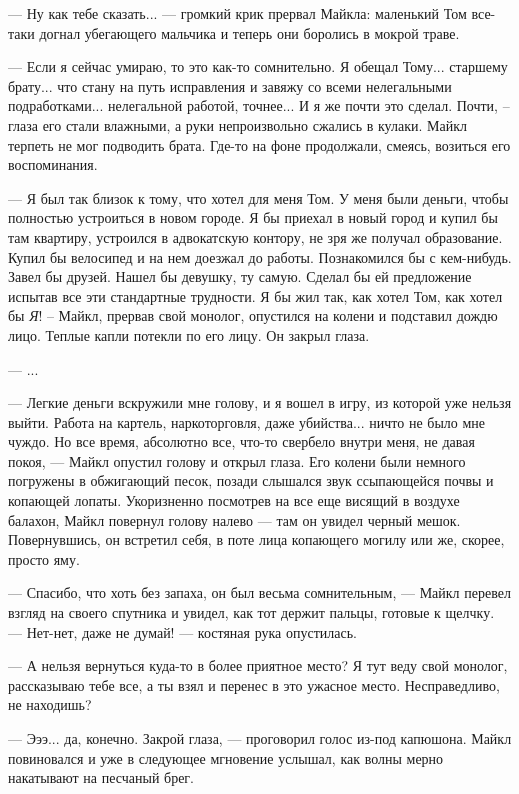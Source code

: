 — Ну как тебе сказать... — громкий крик прервал Майкла: маленький Том все-таки догнал убегающего мальчика и теперь они боролись в мокрой траве. 

— Если я сейчас умираю, то это как-то сомнительно. Я обещал Тому... старшему брату... что стану на путь исправления и завяжу со всеми нелегальными подработками... нелегальной работой, точнее...  И я же почти это сделал. Почти, – глаза его стали влажными, а руки непроизвольно сжались в кулаки. Майкл терпеть не мог подводить брата. Где-то на фоне продолжали, смеясь, возиться его воспоминания.

— Я был так близок к тому, что хотел для меня Том. У меня были деньги, чтобы полностью устроиться в новом городе. Я бы приехал в новый город и купил бы там квартиру, устроился в адвокатскую контору, не зря же получал образование. Купил бы велосипед и на нем доезжал до работы. Познакомился бы с кем-нибудь. Завел бы друзей. Нашел бы девушку, ту самую. Сделал бы ей предложение испытав все эти стандартные трудности. Я бы жил так, как хотел Том, как хотел бы \textit{Я}! – Майкл, прервав свой монолог, опустился на колени и подставил дождю лицо. Теплые капли потекли по его лицу. Он закрыл глаза.

— ... 

— Легкие деньги вскружили мне голову, и я вошел в игру, из которой уже нельзя выйти. Работа на картель, наркоторговля, даже убийства... ничто не было мне чуждо. Но все время, абсолютно все, что-то свербело внутри меня, не давая покоя, — Майкл опустил голову и открыл глаза. Его колени были немного погружены в обжигающий песок, позади слышался звук ссыпающейся почвы и копающей лопаты. Укоризненно посмотрев на все еще висящий в воздухе балахон, Майкл повернул голову налево — там он увидел черный мешок. Повернувшись, он встретил себя, в поте лица копающего могилу или же, скорее, просто яму. 

— Спасибо, что хоть без запаха, он был весьма сомнительным, — Майкл перевел взгляд на своего спутника и увидел, как тот держит пальцы, готовые к щелчку. — Нет-нет, даже не думай! — костяная рука опустилась.

— А нельзя вернуться куда-то в более приятное место? Я тут веду свой монолог, рассказываю тебе все, а ты взял и перенес в это ужасное место. Несправедливо, не находишь?

— Эээ... да, конечно. Закрой глаза, — проговорил голос из-под капюшона. Майкл повиновался и уже в следующее мгновение услышал, как волны мерно накатывают на песчаный брег.

